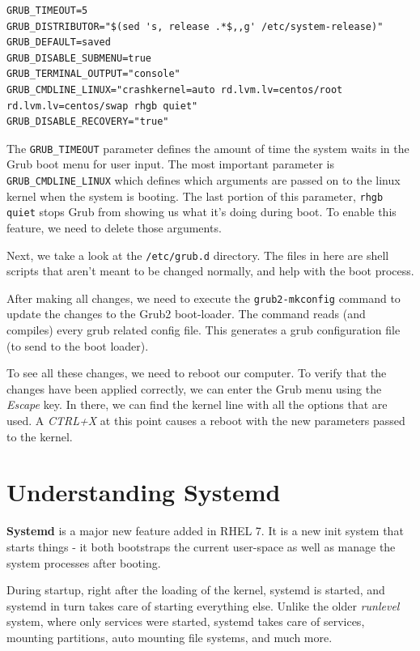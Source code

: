 \vspace{-15pt}
\begin{verbatim}
GRUB_TIMEOUT=5
GRUB_DISTRIBUTOR="$(sed 's, release .*$,,g' /etc/system-release)"
GRUB_DEFAULT=saved
GRUB_DISABLE_SUBMENU=true
GRUB_TERMINAL_OUTPUT="console"
GRUB_CMDLINE_LINUX="crashkernel=auto rd.lvm.lv=centos/root rd.lvm.lv=centos/swap rhgb quiet"
GRUB_DISABLE_RECOVERY="true"
\end{verbatim}
\vspace{-10pt}

\noindent
The \verb|GRUB_TIMEOUT| parameter defines the amount of time the system waits in the Grub boot menu for user input. The most important parameter is \verb|GRUB_CMDLINE_LINUX| which defines which arguments are passed on to the linux kernel when the system is booting. The last portion of this parameter, \verb|rhgb quiet| stops Grub from showing us what it's doing during boot. To enable this feature, we need to delete those arguments. 

Next, we take a look at the \verb|/etc/grub.d| directory. The files in here are shell scripts that aren't meant to be changed normally, and help with the boot process. 

After making all changes, we need to execute the \verb|grub2-mkconfig| command to update the changes to the Grub2 boot-loader. The command reads (and compiles) every grub related config file. This generates a grub configuration file (to send to the boot loader). 

To see all these changes, we need to reboot our computer. To verify that the changes have been applied correctly, we can enter the Grub menu using the \textit{Escape} key. In there, we can find the kernel line with all the options that are used. A \textit{CTRL+X} at this point causes a reboot with the new parameters passed to the kernel. 

\section{Understanding Systemd}
\textbf{Systemd} is a major new feature added in RHEL 7. It is a new init system that starts things - it both bootstraps the current user-space as well as manage the system processes after booting. 

During startup, right after the loading of the kernel, systemd is started, and systemd in turn takes care of starting everything else. Unlike the older \textit{runlevel} system, where only services were started, systemd takes care of services, mounting partitions, auto mounting file systems, and much more. 

